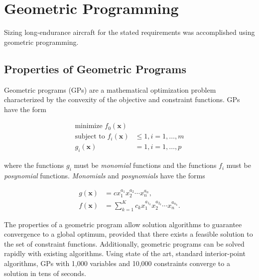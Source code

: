 \chapter{Geometric Programming}

Sizing long-endurance aircraft for the stated requirements was accomplished using geometric programming. 

\section{Properties of Geometric Programs}

Geometric programs (GPs) are a mathematical optimization problem characterized by the convexity of the objective and constraint functions.\cite{gp} GPs have the form

\begin{align} 
\label{e:gpform}
\text{minimize } f_0(\bm{x}) & \nonumber \\
\text{subject to  } f_i(\bm{x}) &\leq 1, i=1,\ldots,m \\
g_i (\bm{x}) &= 1, i = 1,\ldots,p 
\end{align}

where the functions $g_i$ must be \emph{monomial} functions and the functions $f_i$ must be \emph{posynomial} functions. \emph{Monomials} and \emph{posynomials} have the forms

\begin{align}
 \label{e:mon}
g(\bm{x}) &= c x_1^{a_1} x_2^{a_2} \dotsm x_n^{a_n} , \\
\label{e:pos}
f(\bm{x}) &= \displaystyle\sum_{k=1}^K c_k x_1^{a_{1_k}} x_2^{a_{2_k}} \dotsm x_n^{a_{n_k}}.
\end{align}

The properties of a geometric program allow solution algorithms to guarantee convergence to a global optimum, provided that there exists a feasible solution to the set of constraint functions.  
Additionally, geometric programs can be solved rapidly with existing algorithms.  
Using state of the art, standard interior-point algorithms, GPs with 1,000 variables and 10,000 constraints converge to a solution in tens of seconds.\cite{gp}  

